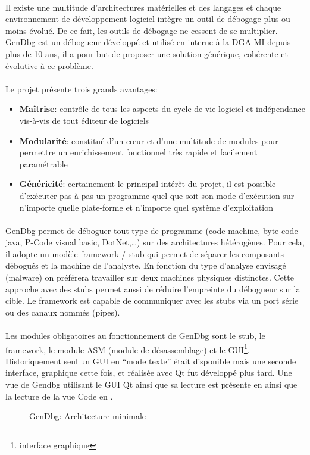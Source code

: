 \documentclass[11pt, book, english, french, standardlists]{upmethodology-document}
\begin{document}
				\paragraph*{}
					Il existe une multitude d'architectures matérielles et des langages et chaque environnement de développement logiciel intègre un outil de débogage plus ou moins évolué. De ce fait, les outils de débogage ne cessent de se multiplier. GenDbg est un débogueur développé et utilisé en interne à la \gls{DGA MI} depuis plus de 10 ans, il a pour but de proposer une solution générique, cohérente et évolutive à ce problème.
				\paragraph*{}
					Le projet présente trois grands avantages:
					\begin{itemize}
						\item \textbf{Maîtrise}: contrôle de tous les aspects du cycle de vie logiciel et indépendance vis-à-vis de tout éditeur de logiciels
						\item \textbf{Modularité}: constitué d'un cœur et d'une multitude de modules pour permettre un enrichissement fonctionnel très rapide et facilement paramétrable
						\item \textbf{Généricité}: certainement le principal intérêt du projet, il est possible d'exécuter pas-à-pas un programme quel que soit son mode d'exécution sur n'importe quelle plate-forme et n'importe quel système d'exploitation
					\end{itemize}
				\paragraph*{}
					GenDbg permet de déboguer tout type de programme (code machine, byte code java, P-Code visual basic, DotNet,\ldots) sur des architectures hétérogènes. Pour cela, il adopte un modèle framework / stub qui permet de séparer les composants débogués et la machine de l'analyste. En fonction du type d'analyse envisagé (malware) on préférera travailler sur deux machines physiques distinctes. Cette approche avec des stubs permet aussi de réduire l'empreinte du débogueur sur la cible. Le framework est capable de communiquer avec les stubs via un port série ou des canaux nommés (pipes).
				\paragraph*{}
					Les modules obligatoires au fonctionnement de GenDbg sont le stub, le framework, le module ASM (module de désassemblage) et le \gls{GUI}\footnote{interface graphique}. Historiquement seul un \gls{GUI} en ``mode texte'' était disponible mais une seconde interface, graphique cette fois, et réalisée avec Qt fut développé plus tard. Une vue de Gendbg utilisant le GUI Qt ainsi que sa lecture est présente en  ainsi que la lecture de la vue Code en .
				\begin{figure}[H]
					\centering
					\caption{GenDbg: Architecture minimale}
					\label{fig:GenDbg_architecture_minimale}
				\end{figure}
\end{document}
